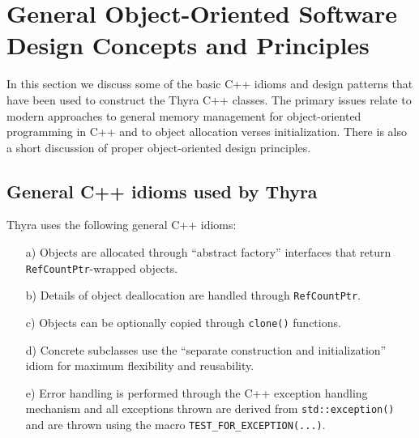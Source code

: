 \documentclass[pdf,ps2pdf,11pt]{SANDreport}
\begin{document}
%
\section{General Object-Oriented Software Design Concepts and Principles}
\label{tsfcore:sec:general_software_concepts}
%

In this section we discuss some of the basic C++ idioms and design
patterns that have been used to construct the Thyra C++ classes.
The primary issues relate to modern approaches to general memory
management for object-oriented programming in C++ and to object
allocation verses initialization.  There is also a short discussion of
proper object-oriented design principles.

%
\subsection{General C++ idioms used by Thyra}
\label{tsfcore:sec:tsfcore-c++-idioms}
%

Thyra uses the following general C++ idioms:

\begin{enumerate}

{}\item[a)] Objects are allocated through ``abstract factory'' interfaces
that return {}\texttt{Ref\-Count\-Ptr}-wrapped objects.

{}\item[b)] Details of object deallocation are handled through
{}\texttt{Ref\-Count\-Ptr}.

{}\item[c)] Objects can be optionally copied through {}\texttt{clone()}
functions.

{}\item[d)] Concrete subclasses use the ``separate construction and
initialization'' idiom for maximum flexibility and reusability.

{}\item[e)] Error handling is performed through the C++ exception
handling mechanism and all exceptions thrown are derived from
{}\texttt{std\-::exception()} and are thrown using the macro
{}\texttt{TEST\-\_FOR\-\_EXCEPTION(...)}.

\end{enumerate}
\end{document}
